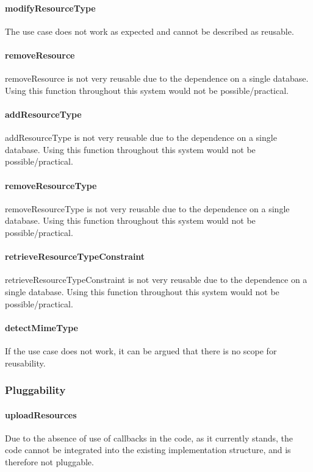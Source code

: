 \documentclass[a4paper]{article}
\begin{document}
\paragraph{modifyResourceType}
The use case does not work as expected and cannot be described as reusable.

\paragraph{removeResource}
removeResource is not very reusable due to the dependence on a single database. Using this function throughout this system would not be possible/practical.

\paragraph{addResourceType}
addResourceType is not very reusable due to the dependence on a single database. Using this function throughout this system would not be possible/practical.

\paragraph{removeResourceType}
removeResourceType is not very reusable due to the dependence on a single database. Using this function throughout this system would not be possible/practical.

\paragraph{retrieveResourceTypeConstraint}
retrieveResourceTypeConstraint is not very reusable due to the dependence on a single database. Using this function throughout this system would not be possible/practical.

\paragraph{detectMimeType}
If the use case does not work, it can be argued that there is no scope for reusability.

\subsubsection {Pluggability}

\paragraph{uploadResources}
Due to the absence of use of callbacks in the code, as it currently stands, the code cannot be integrated into the existing implementation structure, and is therefore not pluggable.
\end{document}

